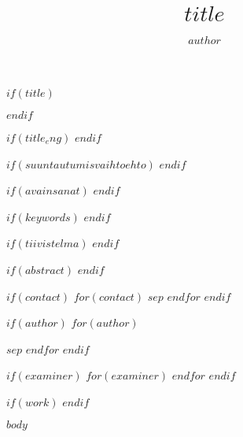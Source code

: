 \documentclass[utf8,bachelor]{gradu3}
\begin{document}
$if(title)$
\title{$title$}
$endif$

$if(title_eng)$
$endif$

$if(suuntautumisvaihtoehto)$
$endif$

$if(avainsanat)$
$endif$

$if(keywords)$
$endif$

$if(tiivistelma)$
$endif$

$if(abstract)$
$endif$

$if(contact)$
$for(contact)$
$sep$
$endfor$
$endif$

$if(author)$
$for(author)$
\author{$author$}$sep$
$endfor$
$endif$

$if(examiner)$
$for(examiner)$
$endfor$
$endif$

$if(work)$
$endif$

\maketitle

\mainmatter

$body$

\printbibliography
\end{document}
